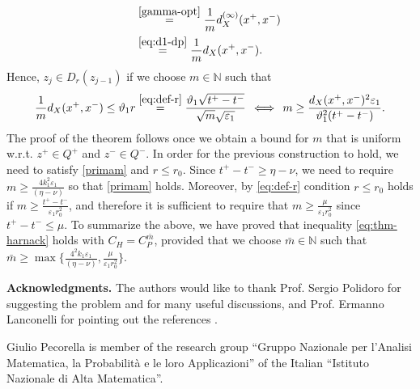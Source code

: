\documentclass[11pt,a4paper]{article}
\numberwithin{equation}{section}
\newcommand{\N}{\mathbb{N}}
\def \e {{\varepsilon}}
\begin{document}
{{\begin{equation}
\begin{aligned}
		&\!\!\!\!\; \overset{\eqref{gamma-opt}}= \frac{1}{m} d^{(\infty)}_X(x^+,x^-)\\
		&\!\!\!\!\;\overset{\eqref{eq:d1-dp}}=\frac{1}{m}d_X(x^+,x^-).
	\end{aligned}
\end{equation}
Hence, $z_j \in D_r(z_{j-1})$ if we choose $m\in\N$ such that
\begin{equation}\label{primam}
	\frac{1}{m} d_X(x^+,x^-) \leq \vartheta_1 r\overset{\eqref{eq:def-r}} = \frac{\vartheta_1 \sqrt{t^+-t^-}}{\sqrt{m}\sqrt{\e_1}} \, \iff \, m \geq \frac{ d_X(x^+,x^-)^2\e_1}{\vartheta_1^2(t^+-t^-)}.
\end{equation}
The proof of the theorem follows once we obtain a bound for $m$ that is uniform w.r.t. $z^+ \in Q^+$ and $z^- \in Q^-$. In order for the previous construction to hold, we need to satisfy \eqref{primam} and $r\leq r_0$. Since $t^+-t^- \geq \eta-\nu$, we need to require $m \geq \frac{4k^2_1\e_1}{(\eta-\nu)}$ so that \eqref{primam} holds. Moreover, by \eqref{eq:def-r} condition $r \leq r_0$ holds if $m \geq \frac{t^+-t^-}{\e_1 r^2_0}$, and therefore it is sufficient to require that $m \geq \frac{\mu}{\e_1 r_0^2}$ since $t^+-t^- \leq \mu$. To summarize the above, we have proved that inequality \eqref{eq:thm-harnack} holds with $C_H=C_P^{\bar m}$, provided that we choose $\bar m \in\N$ such that $\bar m \geq \max \Big\lbrace \frac{4^2k_1\e_1}{(\eta-\nu)},\frac{\mu}{\e_1 r_0^2} \Big\rbrace$.




\medskip\medskip\medskip\medskip
{\bf Acknowledgments.} The authors would like to thank Prof. Sergio Polidoro for suggesting the problem and for many useful discussions, and Prof. Ermanno Lanconelli for pointing out the references \cite{lanconelli1,lanconelli2}. 

 
Giulio Pecorella is member of the research group “Gruppo Nazionale per l’Analisi Matematica, la Probabilità e le loro Applicazioni” of the Italian “Istituto Nazionale di Alta Matematica”.

\appendix
}}
\end{document}
